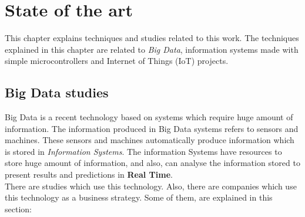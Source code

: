 
\chapter{State of the art}
\newpage

This chapter explains techniques and studies related to this work. The techniques explained in this chapter are related to \textit{Big Data}, information systems made with simple microcontrollers \cite{microcontrollers} and Internet of Things (IoT) projects.\\

\section{Big Data studies}

Big Data is a recent technology based on systems which require huge amount of information. The information produced in Big Data systems refers to sensors and machines. These sensors and machines automatically produce information which is stored in \textit{Information Systems}. The information Systems have resources to store huge amount of information, and also, can analyse the information stored to present results and predictions in \textbf{Real Time}.\\

There are studies which use this technology. Also, there are companies which use this technology as a business strategy. Some of them, are explained in this section:

